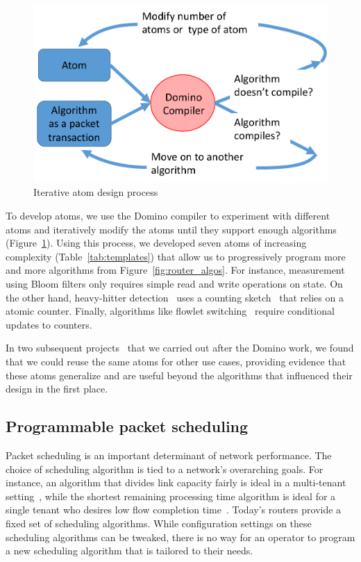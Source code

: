 \begin{figure}
\centering
\includegraphics[width=0.4\columnwidth]{iterative_design_process.pdf}
\caption{Iterative atom design process}
\label{fig:iterative_design}
\end{figure}

To develop atoms, we use the Domino compiler to experiment with different atoms
and iteratively modify the atoms until they support enough algorithms
(Figure~\ref{fig:iterative_design}).  Using this process, we developed seven
atoms of increasing complexity (Table~\ref{tab:templates}) that allow us to
progressively program more and more algorithms from
Figure~\ref{fig:router_algos}. For instance, measurement using Bloom filters
only requires simple read and write operations on state. On the other hand,
heavy-hitter detection~\cite{opensketch} uses a counting
sketch~\cite{count_min} that relies on a atomic counter. Finally, algorithms
like flowlet switching~\cite{flare} require conditional updates to counters.

In two subsequent projects~\cite{hula, perf_query} that we carried out after
the Domino work, we found that we could reuse the same atoms for other use
cases, providing evidence that these atoms generalize and are useful beyond the
algorithms that influenced their design in the first place.

\subsection{Programmable packet scheduling}
Packet scheduling is an important determinant of network performance. The
choice of scheduling algorithm is tied to a network's overarching goals. For
instance, an algorithm that divides link capacity fairly is ideal in a
multi-tenant setting~\cite{wfq}, while the shortest remaining processing time
algorithm is ideal for a single tenant who desires low flow completion
time~\cite{pFabric}. Today's routers provide a fixed set of scheduling
algorithms. While configuration settings on these scheduling algorithms can be
tweaked, there is no way for an operator to program a new scheduling algorithm
that is tailored to their needs.

